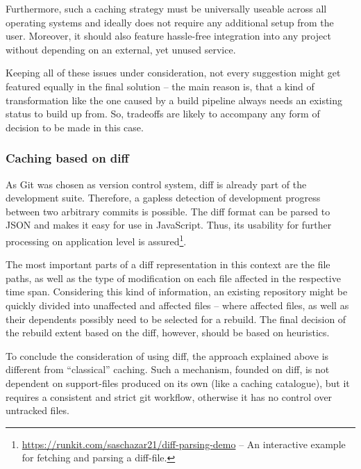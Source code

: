 Furthermore, such a caching strategy must be universally useable across all operating systems and ideally does not require any additional setup from the user. Moreover, it should also feature hassle-free integration into any project without depending on an external, yet unused service.

Keeping all of these issues under consideration, not every suggestion might get featured equally in the final solution -- the main reason is, that a kind of transformation like the one caused by a build pipeline always needs an existing status to build up from. So, tradeoffs are likely to accompany any form of decision to be made in this case.

\subsubsection{Caching based on diff}
As Git was chosen as version control system, diff is already part of the development suite. Therefore, a gapless detection of development progress between two arbitrary commits is possible. The diff format can be parsed to JSON and makes it easy for use in JavaScript. Thus, its usability for further processing on application level is assured\footnote{\url{https://runkit.com/saschazar21/diff-parsing-demo} -- An interactive example for fetching and parsing a diff-file.}.

The most important parts of a diff representation in this context are the file paths, as well as the type of modification on each file affected in the respective time span. Considering this kind of information, an existing repository might be quickly divided into unaffected and affected files -- where affected files, as well as their dependents possibly need to be selected for a rebuild. The final decision of the rebuild extent based on the diff, however, should be based on heuristics.

To conclude the consideration of using diff, the approach explained above is different from ``classical'' caching. Such a mechanism, founded on diff, is not dependent on support-files produced on its own (like a caching catalogue), but it requires a consistent and strict git workflow, otherwise it has no control over untracked files.
